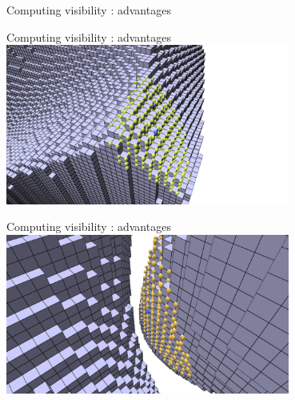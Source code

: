 \documentclass[11pt]{beamer}
\begin{document}
\begin{frame}{Computing visibility : advantages}
    \end{frame}
    \begin{frame}{Computing visibility : advantages}
        \centering
        \hspace{1em}\includegraphics[width=0.7\textwidth,xshift=1em]{pictures/visibility_from_given_point_r_10}
        \newline
    \end{frame}
    \begin{frame}{Computing visibility : advantages}
        \centering
        \includegraphics[width=0.7\textwidth]{pictures/visibility_aware_of_features}
        \newline
    \end{frame}
\end{document}
